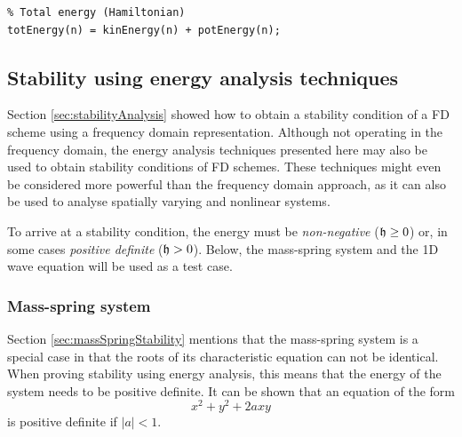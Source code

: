 {{{{\begin{lstlisting}
% Total energy (Hamiltonian)
totEnergy(n) = kinEnergy(n) + potEnergy(n);
\end{lstlisting}


\subsection{Stability using energy analysis techniques}\label{sec:stabilityAnalysisEnergy}
Section \ref{sec:stabilityAnalysis} showed how to obtain a stability condition of a FD scheme using a frequency domain representation. Although not operating in the frequency domain, the energy analysis techniques presented here may also be used to obtain stability conditions of FD schemes. These techniques might even be considered more powerful than the frequency domain approach, as it can also be used to analyse spatially varying and nonlinear systems.

To arrive at a stability condition, the energy must be \textit{non-negative} ($\mathfrak{h} \geq 0$) or, in some cases \textit{positive definite} ($\mathfrak{h} > 0$). Below, the mass-spring system and the 1D wave equation will be used as a test case.

\subsubsection{Mass-spring system}
Section \ref{sec:massSpringStability} mentions that the mass-spring system is a special case in that the roots of its characteristic equation can not be identical. When proving stability using energy analysis, this means that the energy of the system needs to be positive definite. It can be shown that an equation of the form 
\begin{equation}\label{eq:quadraticForm}
    x^2 + y^2  + 2axy
\end{equation} 
is positive definite if $|a| < 1$.%

}}}}
